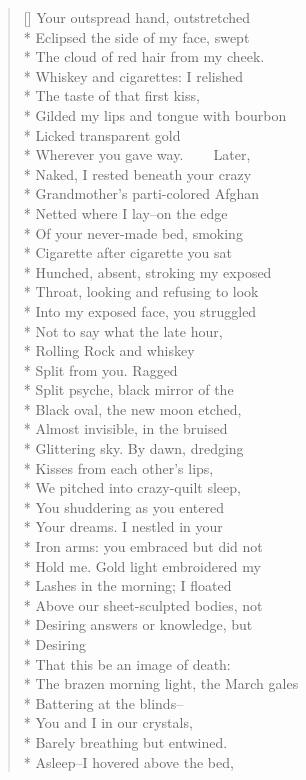 \label{ch:desire}
\settowidth{\versewidth}{The searing, distant god?      And if you}
\begin{verse}[\versewidth]
Your outspread hand, outstretched\\*
Eclipsed the side of my face, swept\\*
The cloud of red hair from my cheek.\\*
Whiskey and cigarettes: I relished\\*
The taste of that first kiss,\\*
Gilded my lips and tongue with bourbon\\*
Licked transparent gold\\*
Wherever you gave way.     Later,\\*
Naked, I rested beneath your crazy\\*
Grandmother's parti-colored Afghan\\*
Netted where I lay--on the edge\\*
Of your never-made bed, smoking\\*
Cigarette after cigarette you sat\\*
Hunched, absent, stroking my exposed\\*
Throat, looking and refusing to look\\*
Into my exposed face, you struggled\\*
Not to say what the late hour,\\*
Rolling Rock and whiskey\\*
Split from you. Ragged\\*
Split psyche, black mirror of the\\*
Black oval, the new moon etched,\\*
Almost invisible, in the bruised\\*
Glittering sky. By dawn, dredging\\*
Kisses from each other's lips,\\*
We pitched into crazy-quilt sleep,\\*
You shuddering as you entered\\*
Your dreams. I nestled in your\\*
Iron arms: you embraced but did not\\*
Hold me. Gold light embroidered my\\*
Lashes in the morning; I floated\\*
Above our sheet-sculpted bodies, not\\*
Desiring answers or knowledge, but\\*
Desiring\\*
That this be an image of death:\\*
The brazen morning light, the March gales\\*
Battering at the blinds--\\*
You and I in our crystals,\\*
Barely breathing but entwined.\\*
Asleep--I hovered above the bed,


\end{verse}
